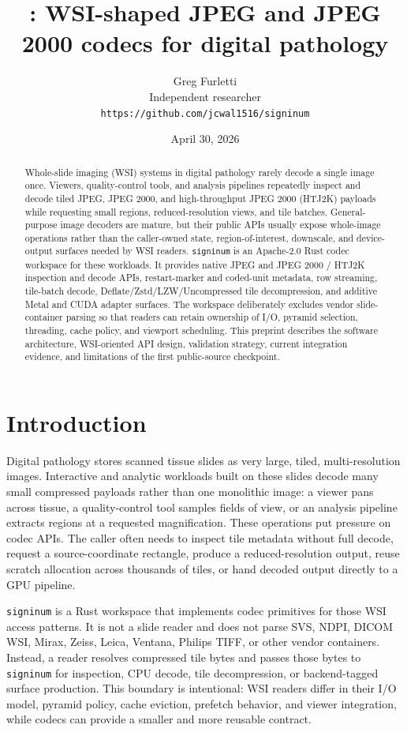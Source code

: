 \documentclass[11pt]{article}
\title{\signinum: WSI-shaped JPEG and JPEG 2000 codecs for digital pathology}
\author{
  Greg Furletti\\
  Independent researcher\\
  \texttt{https://github.com/jcwal1516/signinum}
}
\date{April 30, 2026}
\newcommand{\signinum}{\texttt{signinum}}
\begin{document}
\maketitle

\begin{abstract}
Whole-slide imaging (WSI) systems in digital pathology rarely decode a single
image once. Viewers, quality-control tools, and analysis pipelines repeatedly
inspect and decode tiled JPEG, JPEG 2000, and high-throughput JPEG 2000
(HTJ2K) payloads while requesting small regions, reduced-resolution views, and
tile batches. General-purpose image decoders are mature, but their public APIs
usually expose whole-image operations rather than the caller-owned state,
region-of-interest, downscale, and device-output surfaces needed by WSI
readers. \signinum{} is an Apache-2.0 Rust codec workspace for these workloads.
It provides native JPEG and JPEG 2000 / HTJ2K inspection and decode APIs,
restart-marker and coded-unit metadata, row streaming, tile-batch decode,
Deflate/Zstd/LZW/Uncompressed tile decompression, and additive Metal and CUDA
adapter surfaces. The workspace deliberately excludes vendor slide-container
parsing so that readers can retain ownership of I/O, pyramid selection,
threading, cache policy, and viewport scheduling. This preprint describes the
software architecture, WSI-oriented API design, validation strategy, current
integration evidence, and limitations of the first public-source checkpoint.
\end{abstract}

\section{Introduction}

Digital pathology stores scanned tissue slides as very large, tiled,
multi-resolution images. Interactive and analytic workloads built on these
slides decode many small compressed payloads rather than one monolithic image:
a viewer pans across tissue, a quality-control tool samples fields of view, or
an analysis pipeline extracts regions at a requested magnification. These
operations put pressure on codec APIs. The caller often needs to inspect tile
metadata without full decode, request a source-coordinate rectangle, produce a
reduced-resolution output, reuse scratch allocation across thousands of tiles,
or hand decoded output directly to a GPU pipeline.

\signinum{} is a Rust workspace that implements codec primitives for those WSI
access patterns. It is not a slide reader and does not parse SVS, NDPI, DICOM
WSI, Mirax, Zeiss, Leica, Ventana, Philips TIFF, or other vendor containers.
Instead, a reader resolves compressed tile bytes and passes those bytes to
\signinum{} for inspection, CPU decode, tile decompression, or backend-tagged
surface production. This boundary is intentional: WSI readers differ in their
I/O model, pyramid policy, cache eviction, prefetch behavior, and viewer
integration, while codecs can provide a smaller and more reusable contract.
\end{document}
